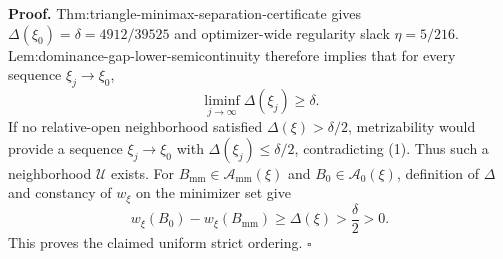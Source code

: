 \textbf{Proof.}
Thm:triangle-minimax-separation-certificate gives \(\Delta(\xi_0)=\delta=4912/39525\) and optimizer-wide regularity slack \(\eta=5/216\).  Lem:dominance-gap-lower-semicontinuity therefore implies that for every sequence \(\xi_j\to\xi_0\),
\[
\liminf_{j\to\infty}\Delta(\xi_j)\ge\delta.
\tag{1}
\]
If no relative-open neighborhood satisfied \(\Delta(\xi)>\delta/2\), metrizability would provide a sequence \(\xi_j\to\xi_0\) with \(\Delta(\xi_j)\le\delta/2\), contradicting (1).  Thus such a neighborhood \(\mathcal U\) exists.  For \(B_{\mathrm{mm}}\in\mathcal A_{\mathrm{mm}}(\xi)\) and \(B_0\in\mathcal A_0(\xi)\), definition of \(\Delta\) and constancy of \(w_\xi\) on the minimizer set give
\[
w_\xi(B_0)-w_\xi(B_{\mathrm{mm}})
\ge\Delta(\xi)>\frac\delta2>0.
\]
This proves the claimed uniform strict ordering. \(\square\)